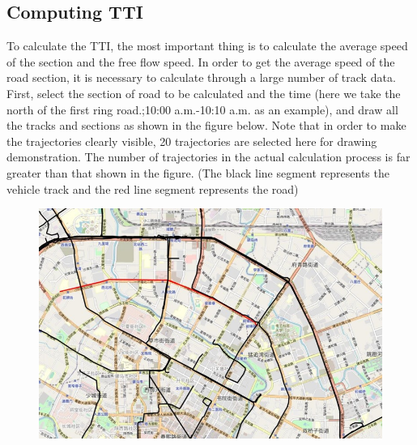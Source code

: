 \documentclass[fontset=none]{ctexart}
\theoremstyle{definition}
\theoremstyle{remark}
\begin{document}
\subsection{Computing TTI}
To calculate the TTI, the most important thing is to calculate the average speed of the section and the free flow speed. In order to get the average speed of the road section, it is necessary to calculate through a large number of track data.
First, select the section of road to be calculated and the time (here we take the north of the first ring road.;10:00 a.m.-10:10 a.m. as an example), and draw all the tracks and sections as shown in the figure below. Note that in order to make the trajectories clearly visible, 20 trajectories are selected here for drawing demonstration. The number of trajectories in the actual calculation process is far greater than that shown in the figure.
(The black line segment represents the vehicle track and the red line segment represents the road)
\begin{figure}[htb]
  \centering
  \includegraphics[width=\textwidth]{images/tti3-1.jpg}
\end{figure}
\end{document}
